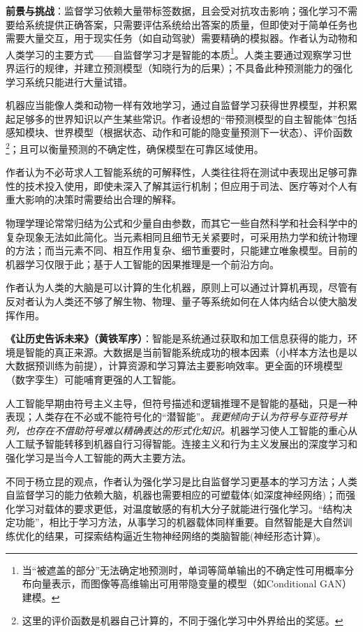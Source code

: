 \par \textbf{前景与挑战}：监督学习依赖大量带标签数据，且会受对抗攻击影响；强化学习不需要给系统提供正确答案，只需要评估系统给出答案的质量，但即使对于简单任务也需要大量交互，用于现实任务（如自动驾驶）需要精确的模拟器。作者认为动物和人类学习的主要方式——自监督学习才是智能的本质\footnote{当“被遮盖的部分”无法确定地预测时，单词等简单输出的不确定性可用概率分布向量表示，而图像等高维输出可用带隐变量的模型（如Conditional GAN）建模。}。人类主要通过观察学习世界运行的规律，并建立预测模型（知晓行为的后果）；不具备此种预测能力的强化学习系统只能进行大量试错。

\par 机器应当能像人类和动物一样有效地学习，通过自监督学习获得世界模型，并积累起足够多的世界知识以产生某些常识。作者设想的“带预测模型的自主智能体”包括感知模块、世界模型（根据状态、动作和可能的隐变量预测下一状态）、评价函数\footnote{这里的评价函数是机器自己计算的，不同于强化学习中外界给出的奖惩。}；且可以衡量预测的不确定性，确保模型在可靠区域使用。

\par 作者认为不必苛求人工智能系统的可解释性，人类往往将在测试中表现出足够可靠性的技术投入使用，即使未深入了解其运行机制；但应用于司法、医疗等对个人有重大影响的决策时需要给出合理的解释。

\par 物理学理论常常归结为公式和少量自由参数，而其它一些自然科学和社会科学中的复杂现象无法如此简化。当元素相同且细节无关紧要时，可采用热力学和统计物理的方法；而当元素不同、相互作用复杂、细节重要时，只能建立唯象模型。目前的机器学习仅限于此；基于人工智能的因果推理是一个前沿方向。

\par 作者认为人类的大脑是可以计算的生化机器，原则上可以通过计算机再现，尽管有反对者认为人类还不够了解生物、物理、量子等系统如何在人体内结合以使大脑发挥作用。

\par \textbf{《让历史告诉未来》（黄铁军序）}：智能是系统通过获取和加工信息获得的能力，环境是智能的真正来源。大数据是当前智能系统成功的根本因素（小样本方法也是以大数据预训练为前提），计算资源和学习算法主要影响效率。更全面的环境模型（数字孪生）可能哺育更强的人工智能。
\par 人工智能早期由符号主义主导，但符号描述和逻辑推理不是智能的基础，只是一种表现；人类存在不必或不能符号化的“潜智能”。\emph{我更倾向于认为符号与亚符号并列，也存在不借助符号难以精确表达的形式化知识。}机器学习使人工智能的重心从人工赋予智能转移到机器自行习得智能。连接主义和行为主义发展出的深度学习和强化学习是当今人工智能的两大主要方法。
\par 不同于杨立昆的观点，作者认为强化学习是比自监督学习更基本的学习方法；人类自监督学习的能力依赖大脑，机器也需要相应的可塑载体(如深度神经网络)；而强化学习对载体的要求更低，对温度敏感的有机大分子就能进行强化学习。“结构决定功能”，相比于学习方法，从事学习的机器载体同样重要。自然智能是大自然训练优化的结果，可探索结构逼近生物神经网络的类脑智能(神经形态计算)。